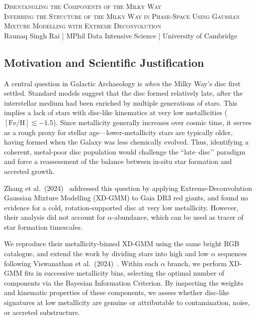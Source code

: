 \documentclass[a4paper,10pt]{article}
\begin{document}
\begin{center}
    {\Large \textsc{Disentangling the Components of the Milky Way}}\\[0.2cm]
    {\textsc{Inferring the Structure of the Milky Way in Phase-Space Using Gaussian Mixture Modelling with Extreme Deconvolution}}\\[0.2cm]
    Raunaq Singh Rai \quad | \quad MPhil Data Intensive Science \quad | \quad University of Cambridge
\end{center}

\begin{multicols}{2}

\section*{Motivation and Scientific Justification}

A central question in Galactic Archaeology is \emph{when} the Milky Way’s disc first settled.  
Standard models suggest that the disc formed relatively late, after the interstellar medium had been enriched by multiple generations of stars. 
This implies a lack of stars with disc-like kinematics at very low metallicities ($[\mathrm{Fe/H}] \lesssim -1.5$). 
Since metallicity generally increases over cosmic time, it serves as a rough proxy for stellar age—lower-metallicity stars are typically older, having formed when the Galaxy was less chemically evolved. 
Thus, identifying a coherent, metal-poor disc population would challenge the “late–disc’’ paradigm and force a reassessment of the balance between in-situ star formation and accreted growth.

Zhang et al.\ (2024)~\cite{zhang2024existencemetalpoordiscmilky} addressed this question by applying Extreme-Deconvolution Gaussian Mixture Modelling (XD-GMM) to Gaia DR3 red giants, and found no evidence for a cold, rotation-supported disc at very low metallicity.  
However, their analysis did not account for $\alpha$-abundance, which can be used as tracer of star formation timescales.

We reproduce their metallicity-binned XD-GMM using the same bright RGB catalogue, and extend the work by dividing stars into high and low $\alpha$ sequences following Viswanathan et al.\ (2024)~\cite{Vis2024}.  
Within each $\alpha$ branch, we perform XD-GMM fits in successive metallicity bins, selecting the optimal number of components via the Bayesian Information Criterion.  
By inspecting the weights and kinematic properties of these components, we assess whether disc-like signatures at low metallicity are genuine or attributable to contamination, noise, or accreted substructure.


\end{multicols}
\end{document}
